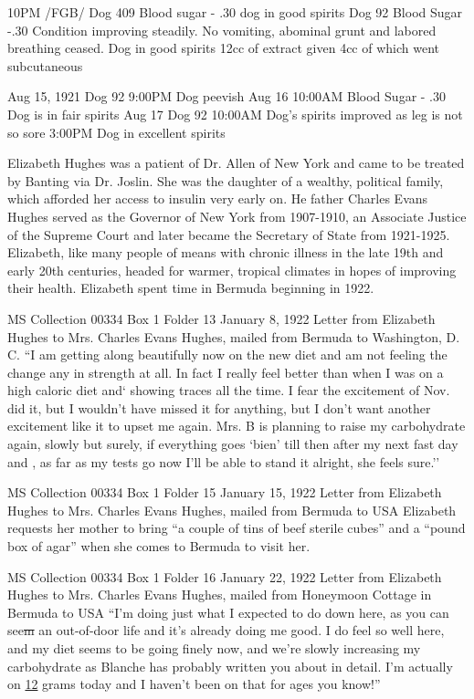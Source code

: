 \documentclass[12pt]{article}
\begin{document}
10PM /FGB/
Dog 409 Blood sugar - .30
dog in good spirits
Dog 92 Blood Sugar -.30
Condition improving steadily. No vomiting, abominal grunt and labored breathing ceased. 
Dog in good spirits
12cc of extract given 4cc of which went subcutaneous

Aug 15, 1921
Dog 92 
9:00PM 
Dog peevish
Aug 16
10:00AM 
Blood Sugar - .30
Dog is in fair spirits
Aug 17 Dog 92
10:00AM
Dog's spirits improved as leg is not so sore
3:00PM
Dog in excellent spirits


Elizabeth Hughes was a patient of Dr. Allen of New York and came to be treated by Banting via Dr. Joslin. She was the daughter of a wealthy, political family, which afforded her access to insulin very early on. He father Charles Evans Hughes served as the Governor of New York from 1907-1910, an Associate Justice of the Supreme Court and later became the Secretary of State from 1921-1925. Elizabeth, like many people of means with chronic illness in the late 19th and early 20th centuries, headed for warmer, tropical climates in hopes of improving their health. Elizabeth spent time in Bermuda beginning in 1922.

MS Collection 00334
Box 1 Folder 13
January 8, 1922
Letter from Elizabeth Hughes to Mrs. Charles Evans Hughes, mailed from Bermuda to Washington, D. C. 
``I am getting along beautifully now on the new diet and am not feeling the change any in strength at all. In fact I really feel better than when I was on a high caloric diet and` showing traces all the time. I fear the excitement of Nov. did it, but I wouldn't have missed it for anything, but I don't want another excitement like it to upset me again. Mrs. B is planning to raise my carbohydrate again, slowly but surely, if everything goes `bien' till then after my next fast day and , as far as my tests go now I'll be able to stand it alright, she feels sure.''


MS Collection 00334
Box 1 Folder 15
January 15, 1922
Letter from Elizabeth Hughes to Mrs. Charles Evans Hughes, mailed from Bermuda to USA
Elizabeth requests her mother to bring ``a couple of tins of beef sterile cubes'' and a ``pound box of agar'' when she comes to Bermuda to visit her. 

MS Collection 00334
Box 1 Folder 16
January 22, 1922
Letter from Elizabeth Hughes to Mrs. Charles Evans Hughes, mailed from Honeymoon Cottage in Bermuda to USA
``I'm doing just what I expected to do down here, as you can see\st{m} an out-of-door life and it's already doing me good. I do feel so well here, and my diet seems to be going finely now, and we're slowly increasing my carbohydrate as Blanche has probably written you about in detail. I'm actually on \underline{12} grams today and I haven't been on that for ages you know!''
\end{document}
